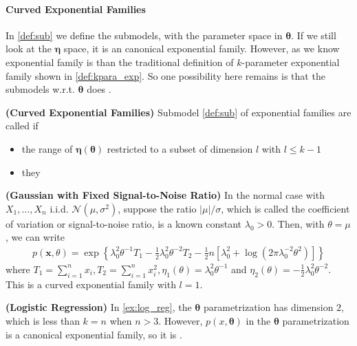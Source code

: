 \documentclass{article}
\newcommand{\bfs}[1]{\textbf{({#1}) }}
\begin{document}
\paragraph{Curved Exponential Families}
In \cref{def:sub} we define the submodels, with the parameter space in $\boldsymbol{\theta}$. If we still look at the $\boldsymbol{\eta}$ space, it is an canonical  exponential family. However, as we know exponential family is  than the traditional definition of $k$-parameter exponential family shown in \cref{def:kpara_exp}. So one possibility here remains is that the  submodels w.r.t. $\boldsymbol{\theta}$ does .

\begin{defa}\bfs{Curved Exponential Families}
 Submodel  \cref{def:sub} of exponential families are called  if
 \begin{itemize}
     \item the range of $\boldsymbol{\eta}(\boldsymbol{\theta})$ restricted to a subset of dimension $l$ with $l \leq k-1$
     \item they 
 \end{itemize}
\end{defa}

\begin{exma}\bfs{Gaussian with Fixed Signal-to-Noise Ratio}
 In the normal case with $X_{1}, \ldots, X_{n}$ i.i.d. $\mathcal{N}\left(\mu, \sigma^{2}\right)$, suppose the ratio $|\mu| / \sigma$, which is called the coefficient of variation or signal-to-noise ratio, is a known constant $\lambda_{0}>0$. Then, with $\theta=\mu$, we can write
\begin{align*}
p(\mathbf{x}, \theta)=\exp \left\{\lambda_{0}^{2} \theta^{-1} T_{1}-\frac{1}{2} \lambda_{0}^{2} \theta^{-2} T_{2}-\frac{1}{2} n\left[\lambda_{0}^{2}+\log \left(2 \pi \lambda_{0}^{-2} \theta^{2}\right)\right]\right\}
\end{align*}
where $T_{1}=\sum_{i=1}^{n} x_{i}, T_{2}=\sum_{i=1}^{n} x_{i}^{2}, \eta_{1}(\theta)=\lambda_{0}^{2} \theta^{-1}$ and $\eta_{2}(\theta)=-\frac{1}{2} \lambda_{0}^{2} \theta^{-2}$. This is a curved exponential family with $l=1$.
\end{exma}
\begin{exma}\bfs{Logistic Regression}
 In \cref{ex:log_reg}, the $\boldsymbol{\theta}$ parametrization has dimension $2$, which is less than $k=n$ when $n>3$. However, $p(x, \boldsymbol{\theta})$ in the $\boldsymbol{\theta}$ parametrization is a canonical exponential family, so it is .
\end{exma}
\end{document}
